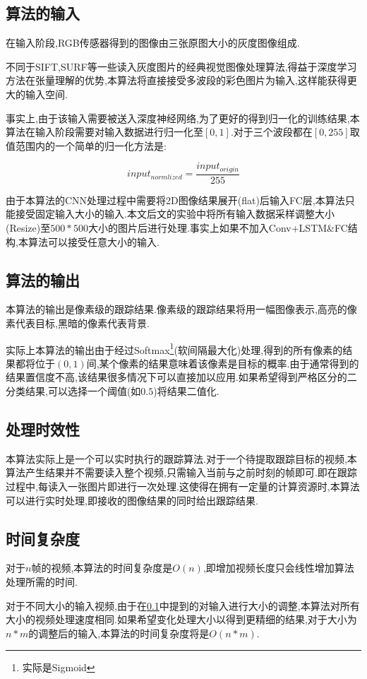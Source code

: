\subsection{算法的输入} \label{section:input_of_our_algorithm}
\par
在输入阶段,RGB传感器得到的图像由三张原图大小的灰度图像组成.
\par
不同于SIFT\supercite{lowe1999object},SURF\supercite{bay2006surf}等一些读入灰度图片的经典视觉图像处理算法,得益于深度学习方法在张量理解的优势,本算法将直接接受多波段的彩色图片为输入,这样能获得更大的输入空间.
\par
事实上,由于该输入需要被送入深度神经网络,为了更好的得到归一化的训练结果,本算法在输入阶段需要对输入数据进行归一化至$[0,1]$.对于三个波段都在$[0,255]$取值范围内的一个简单的归一化方法是:
\par
\begin{equation}\label{equ:input_norm}  input_{normlized} = \frac{input_{origin}}{255}  \end{equation}
\par
由于本算法的CNN处理过程中需要将2D图像结果展开(flat)后输入FC层,本算法只能接受固定输入大小的输入.本文后文的实验中将所有输入数据采样调整大小(Resize)至$500*500$大小的图片后进行处理.事实上如果不加入Conv+LSTM\&FC结构,本算法可以接受任意大小的输入.
\par

\subsection{算法的输出}
本算法的输出是像素级的跟踪结果.像素级的跟踪结果将用一幅图像表示,高亮的像素代表目标,黑暗的像素代表背景.
\par
实际上本算法的输出由于经过Softmax\footnote{实际是Sigmoid}(软间隔最大化)处理,得到的所有像素的结果都将位于$(0,1)$间,某个像素的结果意味着该像素是目标的概率.由于通常得到的结果置信度不高,该结果很多情况下可以直接加以应用.如果希望得到严格区分的二分类结果,可以选择一个阈值(如$0.5$)将结果二值化.

\subsection{处理时效性}
本算法实际上是一个可以实时执行的跟踪算法.对于一个待提取跟踪目标的视频,本算法产生结果并不需要读入整个视频,只需输入当前与之前时刻的帧即可.即在跟踪过程中,每读入一张图片即进行一次处理.这使得在拥有一定量的计算资源时,本算法可以进行实时处理,即接收的图像结果的同时给出跟踪结果.

\subsection{时间复杂度}
对于$n$帧的视频,本算法的时间复杂度是$O(n)$,即增加视频长度只会线性增加算法处理所需的时间.
\par
对于不同大小的输入视频,由于在\ref{section:input_of_our_algorithm}中提到的对输入进行大小的调整,本算法对所有大小的视频处理速度相同.如果希望变化处理大小以得到更精细的结果,对于大小为$n*m$的调整后的输入,本算法的时间复杂度将是$O(n*m)$.


